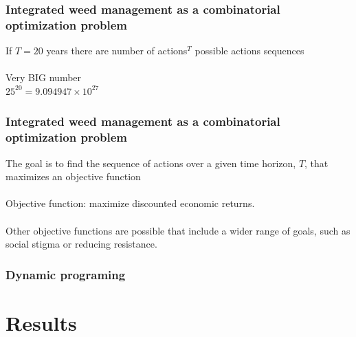 \documentclass[]{beamer}
\begin{document}
  \begin{frame}
    \frametitle{Integrated weed management as a combinatorial optimization problem}
    If $T = 20$ years there are number of actions$^T$ possible actions sequences 
    \\~\\
    Very BIG number\\
    $25^{20} = 9.094947 \times 10^{27}$ 
  \end{frame}

  \begin{frame}
    \frametitle{Integrated weed management as a combinatorial optimization problem}
     The goal is to find the sequence of actions over a given time horizon, $T$, that maximizes an objective function 
     \\~\\
    Objective function: maximize discounted economic returns.
    \\~\\
    Other objective functions are possible that include a wider range of goals, such as social stigma or reducing resistance.  
  \end{frame}
  
  \begin{frame}
    \frametitle{Dynamic programing}
  \end{frame}

\section{Results}   
  \begin{frame}
    \begin{columns}[c]
  	  \column{2.5in}  %
      \column{2.5in}  %
    \end{columns}
  \end{frame}
  
  \begin{frame}
    \begin{columns}[c]
  	  \column{2.5in}  %
  	  \\~\\
      \column{2.5in}  %
        \\~\\
    \end{columns}
  \end{frame}
  
\end{document}
